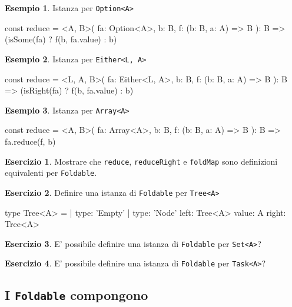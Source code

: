 \documentclass[12pt]{article}
\theoremstyle{definition}
\newtheorem{example}{Esempio}[section]
\newtheorem{exercise}{Esercizio}[section]
\newenvironment{code}
  {\vspace{0.5cm} \VerbatimEnvironment\begin{typescriptcode}}
  {\end{typescriptcode} \vspace{0.2cm}}
\begin{document}
\begin{example}
Istanza per \texttt{Option<A>}

\begin{code}
const reduce = <A, B>(
  fa: Option<A>,
  b: B,
  f: (b: B, a: A) => B
): B => (isSome(fa) ? f(b, fa.value) : b)
\end{code}
\end{example}

\begin{example}
Istanza per \texttt{Either<L, A>}

\begin{code}
const reduce = <L, A, B>(
  fa: Either<L, A>,
  b: B,
  f: (b: B, a: A) => B
): B => (isRight(fa) ? f(b, fa.value) : b)
\end{code}
\end{example}

\begin{example}
Istanza per \texttt{Array<A>}

\begin{code}
const reduce = <A, B>(
  fa: Array<A>,
  b: B,
  f: (b: B, a: A) => B
): B => fa.reduce(f, b)
\end{code}
\end{example}

\begin{exercise}
Mostrare che \texttt{reduce}, \texttt{reduceRight} e \texttt{foldMap} sono definizioni equivalenti per \texttt{Foldable}.
\end{exercise}

\begin{exercise}
Definire una istanza di \texttt{Foldable} per \texttt{Tree<A>}

\begin{code}
type Tree<A> =
  | { type: 'Empty' }
  | {
      type: 'Node'
      left: Tree<A>
      value: A
      right: Tree<A>
    }
\end{code}
\end{exercise}

\begin{exercise}
E' possibile definire una istanza di \texttt{Foldable} per \texttt{Set<A>}?
\end{exercise}

\begin{exercise}
E' possibile definire una istanza di \texttt{Foldable} per \texttt{Task<A>}?
\end{exercise}

\subsection{I \texttt{Foldable} compongono}
\end{document}
